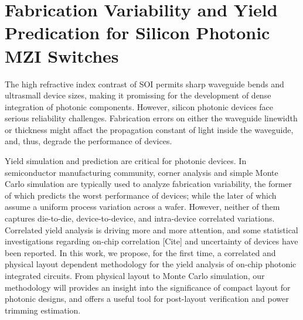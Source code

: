 \graphicspath{{figs_chris/}}


\section{Fabrication Variability and Yield Predication for Silicon Photonic MZI Switches}
\label{sec:variability}
The high refractive index contrast of SOI permits sharp waveguide bends and ultrasmall device sizes, making it promissing for the development of dense integration of photonic components. However, silicon photonic devices face serious reliability challenges. Fabrication errors on either the waveguide linewidth or thickness might affact the propagation constant of light inside the waveguide, and, thus, degrade the performance of devices. 

Yield simulation and prediction are critical for photonic devices. In semiconductor manufacturing community, corner analysis and simple Monte Carlo simulation are typically used to analyze fabrication variability, the former of which predicts the worst performance of devices; while the later of which assume a uniform process variation across a wafer. However, neither of them captures die-to-die, device-to-device, and intra-device correlated variations. Correlated yield analysis is driving more and more attention, and some statistical investigations regarding on-chip correlation [Cite] and uncertainty of devices have been reported. In this work, we propose, for the first time, a correlated and physical layout dependent methodology for the yield analysis of on-chip photonic integrated circuits. From physical layout to Monte Carlo simulation, our methodology will provides an insight into the significance of compact layout for photonic designs, and offers a useful tool for post-layout verification and power trimming estimation.


